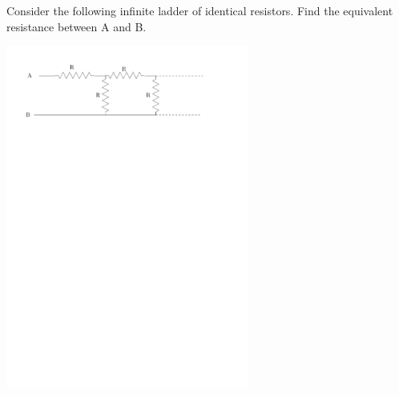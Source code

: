 \documentclass[12pt]{article}
\begin{document}
\newpage

\noindent Consider the following infinite ladder of identical resistors.  Find the equivalent resistance between A and B.  

\includegraphics[width=0.6\textwidth]{infinite_ladder.pdf}
\end{document}
